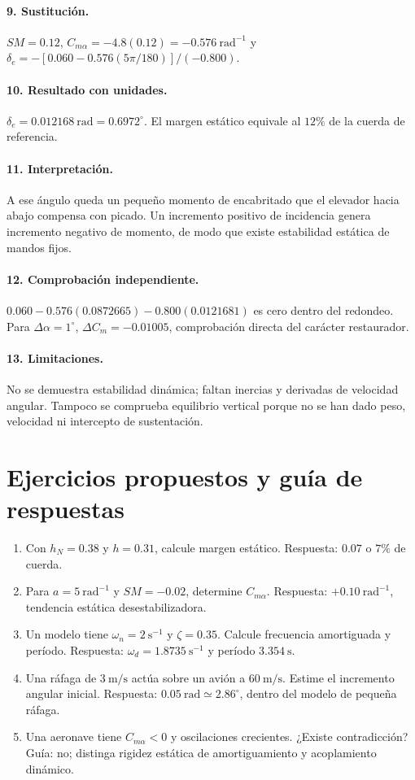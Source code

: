 \paragraph{9. Sustitución.} $SM=0.12$, $C_{m\alpha}=-4.8(0.12)=-0.576\ \mathrm{rad^{-1}}$ y $\delta_e=-[0.060-0.576(5\pi/180)]/(-0.800)$.
\paragraph{10. Resultado con unidades.} $\delta_e=0.012168\ \mathrm{rad}=0.6972^\circ$. El margen estático equivale al $12\%$ de la cuerda de referencia.
\paragraph{11. Interpretación.} A ese ángulo queda un pequeño momento de encabritado que el elevador hacia abajo compensa con picado. Un incremento positivo de incidencia genera incremento negativo de momento, de modo que existe estabilidad estática de mandos fijos.
\paragraph{12. Comprobación independiente.} $0.060-0.576(0.0872665)-0.800(0.0121681)$ es cero dentro del redondeo. Para $\Delta\alpha=1^\circ$, $\Delta C_m=-0.01005$, comprobación directa del carácter restaurador.
\paragraph{13. Limitaciones.} No se demuestra estabilidad dinámica; faltan inercias y derivadas de velocidad angular. Tampoco se comprueba equilibrio vertical porque no se han dado peso, velocidad ni intercepto de sustentación.

\section{Ejercicios propuestos y guía de respuestas}
\begin{enumerate}
\item Con $h_N=0.38$ y $h=0.31$, calcule margen estático. Respuesta: $0.07$ o $7\%$ de cuerda.
\item Para $a=5\ \mathrm{rad^{-1}}$ y $SM=-0.02$, determine $C_{m\alpha}$. Respuesta: $+0.10\ \mathrm{rad^{-1}}$, tendencia estática desestabilizadora.
\item Un modelo tiene $\omega_n=2\ \mathrm{s^{-1}}$ y $\zeta=0.35$. Calcule frecuencia amortiguada y período. Respuesta: $\omega_d=1.8735\ \mathrm{s^{-1}}$ y período $3.354\ \mathrm s$.
\item Una ráfaga de $3\ \mathrm{m/s}$ actúa sobre un avión a $60\ \mathrm{m/s}$. Estime el incremento angular inicial. Respuesta: $0.05\ \mathrm{rad}\simeq2.86^\circ$, dentro del modelo de pequeña ráfaga.
\item Una aeronave tiene $C_{m\alpha}<0$ y oscilaciones crecientes. ¿Existe contradicción? Guía: no; distinga rigidez estática de amortiguamiento y acoplamiento dinámico.
\end{enumerate}
